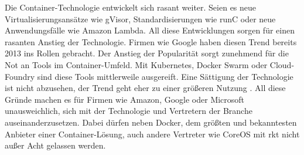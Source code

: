 Die Container-Technologie entwickelt sich rasant weiter. Seien es neue Virtualisierungsansätze wie gVisor, Standardisierungen wie runC oder neue Anwendungsfälle wie Amazon Lambda. All diese Entwicklungen sorgen für einen rasanten Anstieg der Technologie. Firmen wie Google haben diesen Trend bereits 2013 ins Rollen gebracht. Der Anstieg der Popularität sorgt zunehmend für die Not an Tools im Container-Umfeld. Mit Kubernetes, Docker Swarm oder Cloud-Foundry sind diese Tools mittlerweile ausgereift. Eine Sättigung der Technologie ist nicht abzusehen, der Trend geht eher zu einer größeren Nutzung \citep{ExploringContainerSecurityDetectandManageanAttack}. All diese Gründe machen es für Firmen wie Amazon, Google oder Microsoft unausweichlich, sich mit der Technologie und Vertretern der Branche auseinanderzusetzen. Dabei dürfen neben Docker, dem größten und bekanntesten Anbieter einer Container-Lösung, auch andere Vertreter wie CoreOS mit rkt nicht außer Acht gelassen werden.

